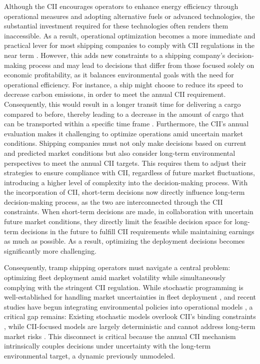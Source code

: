 \documentclass[11pt,english]{article}
\begin{document}
Although the CII encourages operators to enhance energy efficiency through operational measures and adopting alternative fuels or advanced technologies, the substantial investment required for these technologies often renders them inaccessible. As a result, operational optimization becomes a more immediate and practical lever for most shipping companies to comply with CII regulations in the near term \citep{yuan2023operational}. However, this adds new constraints to a shipping company's decision-making process and may lead to decisions that differ from those focused solely on economic profitability, as it balances environmental goals with the need for operational efficiency. For instance, a ship might choose to reduce its speed to decrease carbon emissions, in order to meet the annual CII requirement. Consequently, this would result in a longer transit time for delivering a cargo compared to before, thereby leading to a decrease in the amount of cargo that can be transported within a specific time frame \citep{hua2024speed}. Furthermore, the CII's annual evaluation makes it challenging to optimize operations amid uncertain market conditions. Shipping companies must not only make decisions based on current and predicted market conditions but also consider long-term environmental perspectives to meet the annual CII targets. This requires them to adjust their strategies to ensure compliance with CII, regardless of future market fluctuations, introducing a higher level of complexity into the decision-making process. With the incorporation of CII, short-term decisions now directly influence long-term decision-making process, as the two are interconnected through the CII constraints. When short-term decisions are made, in collaboration with uncertain future market conditions, they directly limit the feasible decision space for long-term decisions in the future to fulfill CII requirements while maintaining earnings as much as possible. As a result, optimizing the deployment decisions becomes significantly more challenging.

Consequently, tramp shipping operators must navigate a central problem: optimizing fleet deployment amid market volatility while simultaneously complying with the stringent CII regulation. While stochastic programming is well-established for handling market uncertainties in fleet deployment \citep{pantuso2016uncertainty, arslan2017bulk}, and recent studies have begun integrating environmental policies into operational models \citep{de2023sailing, wang2021paradox}, a critical gap remains: Existing stochastic models overlook CII's binding constraints \citep{wu2021robust, pantuso2016uncertainty}, while CII-focused models are largely deterministic and cannot address long-term market risks \citep{cheng2025cargo}. This disconnect is critical because the annual CII mechanism intrinsically couples decisions under uncertainty with the long-term environmental target, a dynamic previously unmodeled.
\end{document}
